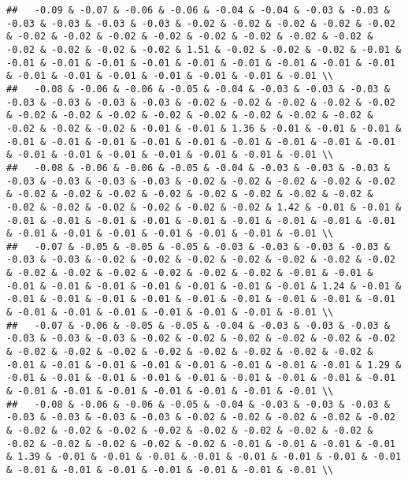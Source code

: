 \documentclass[
]{article}
\begin{document}
\begin{verbatim}
##   -0.09 & -0.07 & -0.06 & -0.06 & -0.04 & -0.04 & -0.03 & -0.03 & -0.03 & -0.03 & -0.03 & -0.03 & -0.02 & -0.02 & -0.02 & -0.02 & -0.02 & -0.02 & -0.02 & -0.02 & -0.02 & -0.02 & -0.02 & -0.02 & -0.02 & -0.02 & -0.02 & -0.02 & -0.02 & 1.51 & -0.02 & -0.02 & -0.02 & -0.01 & -0.01 & -0.01 & -0.01 & -0.01 & -0.01 & -0.01 & -0.01 & -0.01 & -0.01 & -0.01 & -0.01 & -0.01 & -0.01 & -0.01 & -0.01 & -0.01 \\ 
##   -0.08 & -0.06 & -0.06 & -0.05 & -0.04 & -0.03 & -0.03 & -0.03 & -0.03 & -0.03 & -0.03 & -0.03 & -0.02 & -0.02 & -0.02 & -0.02 & -0.02 & -0.02 & -0.02 & -0.02 & -0.02 & -0.02 & -0.02 & -0.02 & -0.02 & -0.02 & -0.02 & -0.02 & -0.01 & -0.01 & 1.36 & -0.01 & -0.01 & -0.01 & -0.01 & -0.01 & -0.01 & -0.01 & -0.01 & -0.01 & -0.01 & -0.01 & -0.01 & -0.01 & -0.01 & -0.01 & -0.01 & -0.01 & -0.01 & -0.01 \\ 
##   -0.08 & -0.06 & -0.06 & -0.05 & -0.04 & -0.03 & -0.03 & -0.03 & -0.03 & -0.03 & -0.03 & -0.03 & -0.02 & -0.02 & -0.02 & -0.02 & -0.02 & -0.02 & -0.02 & -0.02 & -0.02 & -0.02 & -0.02 & -0.02 & -0.02 & -0.02 & -0.02 & -0.02 & -0.02 & -0.02 & -0.02 & 1.42 & -0.01 & -0.01 & -0.01 & -0.01 & -0.01 & -0.01 & -0.01 & -0.01 & -0.01 & -0.01 & -0.01 & -0.01 & -0.01 & -0.01 & -0.01 & -0.01 & -0.01 & -0.01 \\ 
##   -0.07 & -0.05 & -0.05 & -0.05 & -0.03 & -0.03 & -0.03 & -0.03 & -0.03 & -0.03 & -0.02 & -0.02 & -0.02 & -0.02 & -0.02 & -0.02 & -0.02 & -0.02 & -0.02 & -0.02 & -0.02 & -0.02 & -0.02 & -0.01 & -0.01 & -0.01 & -0.01 & -0.01 & -0.01 & -0.01 & -0.01 & -0.01 & 1.24 & -0.01 & -0.01 & -0.01 & -0.01 & -0.01 & -0.01 & -0.01 & -0.01 & -0.01 & -0.01 & -0.01 & -0.01 & -0.01 & -0.01 & -0.01 & -0.01 & -0.01 \\ 
##   -0.07 & -0.06 & -0.05 & -0.05 & -0.04 & -0.03 & -0.03 & -0.03 & -0.03 & -0.03 & -0.03 & -0.02 & -0.02 & -0.02 & -0.02 & -0.02 & -0.02 & -0.02 & -0.02 & -0.02 & -0.02 & -0.02 & -0.02 & -0.02 & -0.02 & -0.01 & -0.01 & -0.01 & -0.01 & -0.01 & -0.01 & -0.01 & -0.01 & 1.29 & -0.01 & -0.01 & -0.01 & -0.01 & -0.01 & -0.01 & -0.01 & -0.01 & -0.01 & -0.01 & -0.01 & -0.01 & -0.01 & -0.01 & -0.01 & -0.01 \\ 
##   -0.08 & -0.06 & -0.06 & -0.05 & -0.04 & -0.03 & -0.03 & -0.03 & -0.03 & -0.03 & -0.03 & -0.03 & -0.02 & -0.02 & -0.02 & -0.02 & -0.02 & -0.02 & -0.02 & -0.02 & -0.02 & -0.02 & -0.02 & -0.02 & -0.02 & -0.02 & -0.02 & -0.02 & -0.02 & -0.02 & -0.01 & -0.01 & -0.01 & -0.01 & 1.39 & -0.01 & -0.01 & -0.01 & -0.01 & -0.01 & -0.01 & -0.01 & -0.01 & -0.01 & -0.01 & -0.01 & -0.01 & -0.01 & -0.01 & -0.01 \\ 

\end{verbatim}
\end{document}
